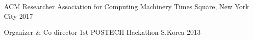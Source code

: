 \begin{cvhonors}

  \cvhonor
    {ACM Researcher} %
    {Association for Computing Machinery} %
    {Times Square, New York City} %
    {2017} %

  \cvhonor
    {Organizer \& Co-director} %
    {1st POSTECH Hackathon} %
    {S.Korea} %
    {2013} %

\end{cvhonors}
